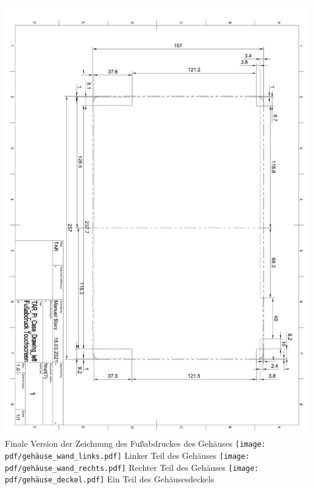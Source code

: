 \includegraphics*[width=1\textwidth,page=1]{pdf/gehäuse_zeichnung_fußabdruck_final.pdf}
\label{fig:case_footprint_final}
Finale Version der Zeichnung des Fußabdruckes des Gehäuses
\newpage
\texttt{[image: pdf/gehäuse\_wand\_links.pdf]}
Linker Teil des Gehäuses
\label{fig:case_left}
\newpage
\texttt{[image: pdf/gehäuse\_wand\_rechts.pdf]}
Rechter Teil des Gehäuses
\label{fig:case_right}
\newpage
\texttt{[image: pdf/gehäuse\_deckel.pdf]}
Ein Teil des Gehäusesdeckels
\label{fig:case_back}
\newpage
